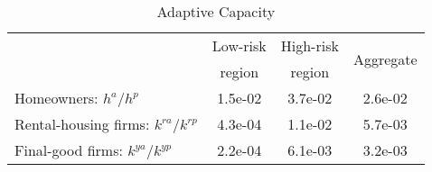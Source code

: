 \begin{table}[H] 
\singlespace 
\center 
\caption{Adaptive Capacity} \label{tab:adaptive_capacity}
\vspace{-.1in} 
\begin{tabular}{l c c c}\hline 
\hline 
 	& Low-risk & High-risk & \multirow{2}{*}{Aggregate} \\[-0.75ex] 
 	& region & region &  \\ 
\hline 
Homeowners: $h^a/h^p$ &  1.5e-02 &  3.7e-02 &  2.6e-02  \\[0.5ex]Rental-housing firms: $k^{ra}/k^{rp}$ &  4.3e-04 &  1.1e-02 &  5.7e-03  \\[0.5ex]Final-good firms: $k^{ya}/k^{yp}$ &  2.2e-04 &  6.1e-03 &  3.2e-03  \\[0.5ex]\hline 
\end{tabular}
\end{table} 
